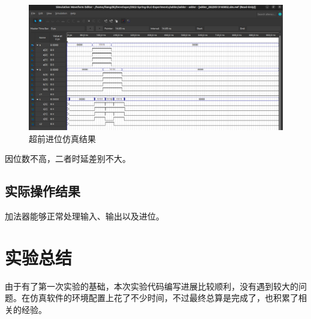 \documentclass[a4paper]{article}
\begin{document}
\begin{figure}[H]
    \centering
    \includegraphics[width=1\textwidth]{./assets/simulation-2.png}
    \caption{超前进位仿真结果}
\end{figure}

因位数不高，二者时延差别不大。

\subsection{实际操作结果}

加法器能够正常处理输入、输出以及进位。

\section{实验总结}

由于有了第一次实验的基础，本次实验代码编写进展比较顺利，没有遇到较大的问题。在仿真软件的环境配置上花了不少时间，不过最终总算是完成了，也积累了相关的经验。
\end{document}
